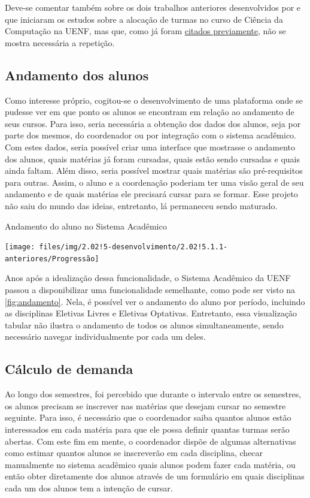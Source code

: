 Deve-se comentar também sobre os dois trabalhos anteriores desenvolvidos por  e  que iniciaram os estudos sobre a alocação de turmas no curso de Ciência da Computação na UENF, mas que, como já foram \hyperref[sec:anteriores]{citados previamente}, não se mostra necessária a repetição.

\subsection{Andamento dos alunos} \label{subsec:andamento} %

Como interesse próprio, cogitou-se o desenvolvimento de uma plataforma onde se pudesse ver em que ponto os alunos se encontram em relação ao andamento de seus cursos. Para isso, seria necessária a obtenção dos dados dos alunos, seja por parte dos mesmos, do coordenador ou por integração com o sistema acadêmico. Com estes dados, seria possível criar uma interface que mostrasse o andamento dos alunos, quais matérias já foram cursadas, quais estão sendo cursadas e quais ainda faltam. Além disso, seria possível mostrar quais matérias são pré-requisitos para outras. Assim, o aluno e a coordenação poderiam ter uma visão geral de seu andamento e de quais matérias ele precisará cursar para se formar. Esse projeto não saiu do mundo das ideias, entretanto, lá permaneceu sendo maturado.

\begin{MyCenteredFigure} \caption{Andamento do aluno no Sistema Acadêmico} \label{fig:andamento}
  \texttt{[image: files/img/2.02!5-desenvolvimento/2.02!5.1.1-anteriores/Progressão]}
\end{MyCenteredFigure}

Anos após a idealização dessa funcionalidade, o Sistema Acadêmico da UENF passou a disponibilizar uma funcionalidade semelhante, como pode ser visto na \autoref{fig:andamento}. Nela, é possível ver o andamento do aluno por período, incluindo as disciplinas Eletivas Livres e Eletivas Optativas. Entretanto, essa visualização tabular não ilustra o andamento de todos os alunos simultaneamente, sendo necessário navegar individualmente por cada um deles.

\subsection{Cálculo de demanda} \label{subsec:demanda} %

Ao longo dos semestres, foi percebido que durante o intervalo entre os semestres, os alunos precisam se inscrever nas matérias que desejam cursar no semestre seguinte. Para isso, é necessário que o coordenador saiba quantos alunos estão interessados em cada matéria para que ele possa definir quantas turmas serão abertas. Com este fim em mente, o coordenador dispõe de algumas alternativas como estimar quantos alunos se inscreverão em cada disciplina, checar manualmente no sistema acadêmico quais alunos podem fazer cada matéria, ou então obter diretamente dos alunos através de um formulário em quais disciplinas cada um dos alunos tem a intenção de cursar.

